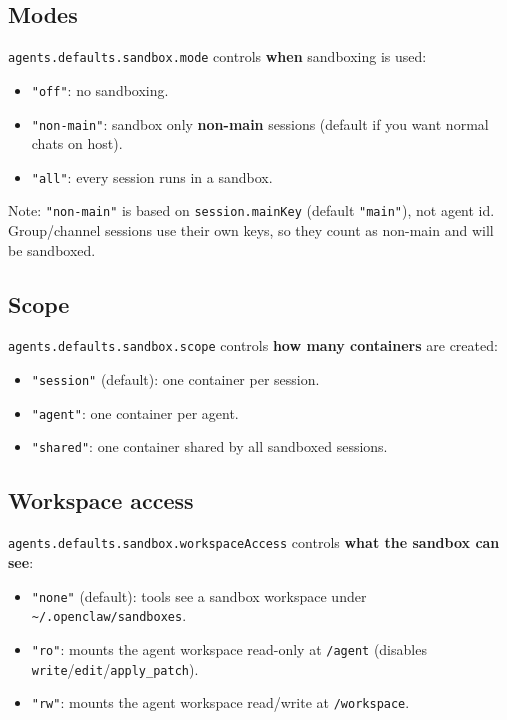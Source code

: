 \subsection{Modes}


\texttt{agents.defaults.sandbox.mode} controls \textbf{when} sandboxing is used:

\begin{itemize}
  \item \texttt{"off"}: no sandboxing.
  \item \texttt{"non-main"}: sandbox only \textbf{non-main} sessions (default if you want normal chats on host).
  \item \texttt{"all"}: every session runs in a sandbox.
\end{itemize}

Note: \texttt{"non-main"} is based on \texttt{session.mainKey} (default \texttt{"main"}), not agent id.
Group/channel sessions use their own keys, so they count as non-main and will be sandboxed.

\subsection{Scope}


\texttt{agents.defaults.sandbox.scope} controls \textbf{how many containers} are created:

\begin{itemize}
  \item \texttt{"session"} (default): one container per session.
  \item \texttt{"agent"}: one container per agent.
  \item \texttt{"shared"}: one container shared by all sandboxed sessions.
\end{itemize}


\subsection{Workspace access}


\texttt{agents.defaults.sandbox.workspaceAccess} controls \textbf{what the sandbox can see}:

\begin{itemize}
  \item \texttt{"none"} (default): tools see a sandbox workspace under \texttt{\textasciitilde{}/.openclaw/sandboxes}.
  \item \texttt{"ro"}: mounts the agent workspace read-only at \texttt{/agent} (disables \texttt{write}/\texttt{edit}/\texttt{apply\_patch}).
  \item \texttt{"rw"}: mounts the agent workspace read/write at \texttt{/workspace}.
\end{itemize}


